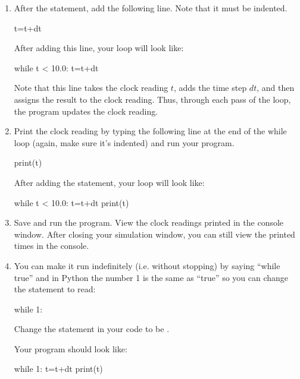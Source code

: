 \begin{enumerate}
\item After the  statement, add the following line. Note that it must be indented.

\begin{myvpython}
	t=t+dt
\end{myvpython}

After adding this line, your  loop will look like:

\begin{myvpython}
while t < 10.0:
	t=t+dt
\end{myvpython}

Note that this line takes the clock reading $t$, adds the time step $dt$, and then assigns the result to the clock reading. Thus, through each pass of the loop, the program updates the clock reading.

\item Print the clock reading by typing the following line at the end of the while loop (again, make sure it's indented) and run your program.

\begin{myvpython}
	print(t)
\end{myvpython}

After adding the  statement, your  loop will look like:

\begin{myvpython}
while t < 10.0:
	t=t+dt
	print(t)
\end{myvpython}

\item Save and run the program. View the clock readings printed in the console window. After closing your simulation window, you can still view the printed times in the console.

\item You can make it run indefinitely (i.e. without stopping) by saying ``while true'' and in Python the number 1 is the same as ``true'' so you can change the  statement to read:

	\begin{verbatimtab}
	while 1:
	\end{verbatimtab}	

Change the  statement in your code to be .

Your program should look like:

\begin{myvpython}
while 1:
	t=t+dt
	print(t)
\end{myvpython}


\end{enumerate}
